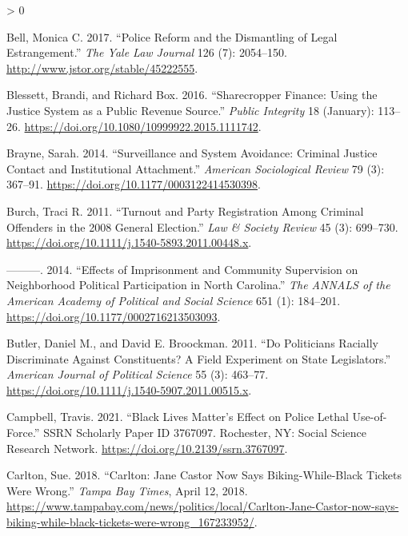 \documentclass[
  12pt,
]{article}
\newlength{\cslhangindent}
\newenvironment{CSLReferences}[2] %
 {%
  \setlength{\parindent}{0pt}
  \ifodd #1 \everypar{\setlength{\hangindent}{\cslhangindent}}\ignorespaces\fi
  \ifnum #2 > 0
  \setlength{\parskip}{#2\baselineskip}
  \fi
 }%
 {}
\begin{document}
\hypertarget{refs}{}
\begin{CSLReferences}{1}{0}
\leavevmode\hypertarget{ref-Bell2017}{}%
Bell, Monica C. 2017. {``Police {Reform} and the {Dismantling} of {Legal Estrangement}.''} \emph{The Yale Law Journal} 126 (7): 2054--150. \url{http://www.jstor.org/stable/45222555}.

\leavevmode\hypertarget{ref-Blessett2016}{}%
Blessett, Brandi, and Richard Box. 2016. {``Sharecropper {Finance}: {Using} the {Justice System} as a {Public Revenue Source}.''} \emph{Public Integrity} 18 (January): 113--26. \url{https://doi.org/10.1080/10999922.2015.1111742}.

\leavevmode\hypertarget{ref-Brayne2014}{}%
Brayne, Sarah. 2014. {``Surveillance and {System Avoidance}: {Criminal Justice Contact} and {Institutional Attachment}.''} \emph{American Sociological Review} 79 (3): 367--91. \url{https://doi.org/10.1177/0003122414530398}.

\leavevmode\hypertarget{ref-Burch2011}{}%
Burch, Traci R. 2011. {``Turnout and {Party Registration} Among {Criminal Offenders} in the 2008 {General Election}.''} \emph{Law \& Society Review} 45 (3): 699--730. \url{https://doi.org/10.1111/j.1540-5893.2011.00448.x}.

\leavevmode\hypertarget{ref-Burch2014}{}%
---------. 2014. {``Effects of {Imprisonment} and {Community Supervision} on {Neighborhood Political Participation} in {North Carolina}.''} \emph{The ANNALS of the American Academy of Political and Social Science} 651 (1): 184--201. \url{https://doi.org/10.1177/0002716213503093}.

\leavevmode\hypertarget{ref-Butler2011}{}%
Butler, Daniel M., and David E. Broockman. 2011. {``Do {Politicians Racially Discriminate Against Constituents}? {A Field Experiment} on {State Legislators}.''} \emph{American Journal of Political Science} 55 (3): 463--77. \url{https://doi.org/10.1111/j.1540-5907.2011.00515.x}.

\leavevmode\hypertarget{ref-Campbell2021}{}%
Campbell, Travis. 2021. {``Black {Lives Matter}'s {Effect} on {Police Lethal Use}-of-{Force}.''} SSRN Scholarly Paper ID 3767097. {Rochester, NY}: {Social Science Research Network}. \url{https://doi.org/10.2139/ssrn.3767097}.

\leavevmode\hypertarget{ref-Carlton2018}{}%
Carlton, Sue. 2018. {``Carlton: {Jane Castor} Now Says Biking-While-Black Tickets Were Wrong.''} \emph{Tampa Bay Times}, April 12, 2018. \url{https://www.tampabay.com/news/politics/local/Carlton-Jane-Castor-now-says-biking-while-black-tickets-were-wrong_167233952/}.


\end{CSLReferences}
\end{document}
